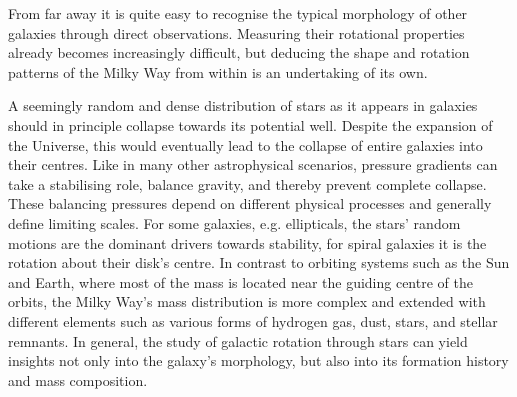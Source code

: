 From far away it is quite easy to recognise the typical morphology of other
galaxies through direct observations.  Measuring their rotational properties already becomes
increasingly difficult, but deducing the shape and rotation patterns of the
Milky Way from within is an undertaking of its own.

A seemingly random and dense distribution of stars as it appears in galaxies
should in principle collapse towards its potential well.  Despite the expansion
of the Universe, this would eventually lead to the collapse of entire galaxies
into their centres.  Like in many other astrophysical scenarios, pressure
gradients can take a stabilising role, balance gravity, and thereby prevent
complete collapse.  These balancing pressures depend on different physical
processes and generally define limiting scales.  For some galaxies, e.g.
ellipticals, the stars' random motions are the dominant drivers towards
stability, for spiral galaxies it is the rotation about their disk's centre.  In
contrast to orbiting systems such as the Sun and Earth, where most of the mass
is located near the guiding centre of the orbits, the Milky Way's mass
distribution is more complex and extended with different elements such as
various forms of hydrogen gas, dust, stars, and stellar remnants.  In general,
the study of galactic rotation through stars can yield insights not only into
the galaxy's morphology, but also into its formation history and mass
composition.  


